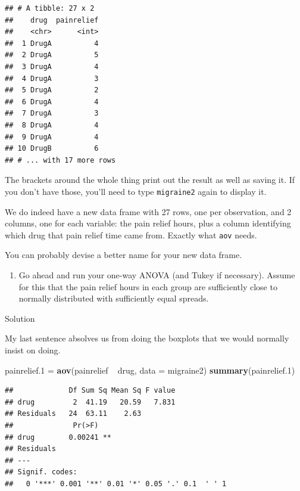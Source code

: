 \documentclass[]{tufte-book}
\newenvironment{Shaded}{}{}
\newcommand{\DataTypeTok}[1]{\textcolor[rgb]{0.56,0.13,0.00}{#1}}
\newcommand{\FloatTok}[1]{\textcolor[rgb]{0.25,0.63,0.44}{#1}}
\newcommand{\KeywordTok}[1]{\textcolor[rgb]{0.00,0.44,0.13}{\textbf{#1}}}
\newcommand{\NormalTok}[1]{#1}
\newcommand{\OperatorTok}[1]{\textcolor[rgb]{0.40,0.40,0.40}{#1}}
\newcommand{\StringTok}[1]{\textcolor[rgb]{0.25,0.44,0.63}{#1}}
\providecommand{\tightlist}{%
  \setlength{\itemsep}{0pt}\setlength{\parskip}{0pt}}
\theoremstyle{definition}
\theoremstyle{definition}
\theoremstyle{definition}
\theoremstyle{remark}
\begin{document}
\begin{verbatim}
## # A tibble: 27 x 2
##    drug  painrelief
##    <chr>      <int>
##  1 DrugA          4
##  2 DrugA          5
##  3 DrugA          4
##  4 DrugA          3
##  5 DrugA          2
##  6 DrugA          4
##  7 DrugA          3
##  8 DrugA          4
##  9 DrugA          4
## 10 DrugB          6
## # ... with 17 more rows
\end{verbatim}

The brackets around the whole thing print out the result as well as
saving it. If you don't have those, you'll need to type
\texttt{migraine2} again to display it.

We do indeed have a new data frame with 27 rows, one per observation,
and 2 columns, one for each variable: the pain relief hours, plus a
column identifying which drug that pain relief time came from. Exactly
what \texttt{aov} needs.

You can probably devise a better name for your new data frame.

\begin{enumerate}
\def\labelenumi{(\alph{enumi})}
\setcounter{enumi}{4}
\tightlist
\item
  Go ahead and run your one-way ANOVA (and Tukey if necessary). Assume
  for this that the pain relief hours in each group are sufficiently
  close to normally distributed with sufficiently equal spreads.
\end{enumerate}

Solution

My last sentence absolves us from doing the boxplots that we would
normally insist on doing.

\begin{Shaded}
\begin{Highlighting}[]
\NormalTok{painrelief}\FloatTok{.1}\NormalTok{ =}\StringTok{ }\KeywordTok{aov}\NormalTok{(painrelief }\OperatorTok{~}\StringTok{ }\NormalTok{drug, }\DataTypeTok{data =}\NormalTok{ migraine2)}
\KeywordTok{summary}\NormalTok{(painrelief}\FloatTok{.1}\NormalTok{)}
\end{Highlighting}
\end{Shaded}

\begin{verbatim}
##             Df Sum Sq Mean Sq F value
## drug         2  41.19   20.59   7.831
## Residuals   24  63.11    2.63        
##              Pr(>F)   
## drug        0.00241 **
## Residuals             
## ---
## Signif. codes:  
##   0 '***' 0.001 '**' 0.01 '*' 0.05 '.' 0.1  ' ' 1
\end{verbatim}
\end{document}
